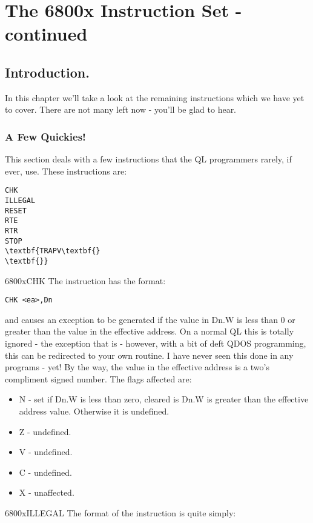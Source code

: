 \chapter{The 6800x Instruction Set -{} continued}

\section{Introduction.}
\label{ch5-intro}%

In this chapter we'll take a look at the remaining instructions
    which we have yet to cover. There are not many left now -{} you'll be glad
    to hear.

\subsection{A Few Quickies!}
\label{ch5-quickies}%

This section deals with a few instructions that the QL programmers
      rarely, if ever, use. These instructions are:

\begin{lstlisting}[firstnumber=1,frame=none,numbers=none]
CHK
ILLEGAL
RESET
RTE
RTR
STOP
\textbf{TRAPV\textbf{}
\textbf{}}\end{lstlisting}
\mc6800x{CHK}
The  instruction has the format:

\begin{lstlisting}[firstnumber=1,]
          CHK <ea>,Dn
\end{lstlisting}

and causes an exception to be generated if the value in Dn.W is
      less than 0 or greater than the value in the effective address. On a
      normal QL this is totally ignored -{} the exception that is -{} however,
      with a bit of deft QDOS programming, this can be redirected to your own
      routine. I have never seen this done in any programs -{} yet! By the way,
      the value in the effective address is a two's compliment signed number.
      The flags affected are:
\begin{itemize}[itemsep=0pt]

\item{}N -{} set if Dn.W is less than zero, cleared is Dn.W is greater
          than the effective address value. Otherwise it is undefined.


\item{}Z -{} undefined.


\item{}V -{} undefined.


\item{}C -{} undefined.


\item{}X -{} unaffected.

\end{itemize}
\mc6800x{ILLEGAL}
The format of the  instruction is quite simply:

